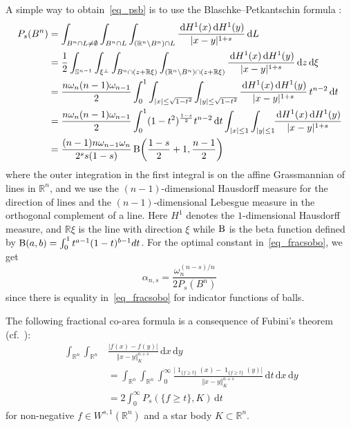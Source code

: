 \documentclass{amsart}
\newcommand{\Bvtex}{{B^n}}
\newcommand{\snvtex}{{\mathbb S}^{n-1}}
\newcommand{\dvtex}{\,\mathrm{d}}
\renewcommand{\chi}{\operatorname{1}}
\begin{document}
A simple way to obtain~\eqref{eq_psb} is to use the Blaschke--Petkantschin
formula \cite[Theorem 7.2.7]{SchneiderWeil}:
%
\begin{align*}
%
P_{s}(\Bvtex )
&= \int _{\Bvtex \cap L\ne \emptyset} \int _{\Bvtex \cap L} \int _{(\mathbb R^{n}
\backslash \Bvtex )\cap L}
\frac{\dvtex H^{1}(x)\dvtex H^{1}(y)}{\vert x-y\vert ^{1+s}} \dvtex L
\\
&=\frac{1}{2}\int _{\snvtex} \int _{\xi ^{\perp}} \int _{\Bvtex \cap (z+
\mathbb R\xi )}\int _{(\mathbb R^{n}\backslash \Bvtex )\cap (z+\mathbb R
\xi )} \frac{\dvtex H^{1}(x)\dvtex H^{1}(y) }{\vert x-y\vert ^{1+s}}\dvtex z \dvtex
\xi
\\
&=\frac{n\omega _{n} (n-1)\omega _{n-1}}{2} \int _{0}^{1} \int _{
\vert x\vert \le \sqrt{1-t^{2}}}\int _{\vert y\vert \le \sqrt{1-t^{2}}}
\frac{\dvtex H^{1}(x)\dvtex H^{1}(y)}{\vert x-y\vert ^{1+s}}\, t^{n-2}\dvtex t
\\
&=\frac{n\omega _{n} (n-1)\omega _{n-1}}{2} \int _{0}^{1}(1-t^{2})^{
\frac{1-s}{2}} t^{n-2}\dvtex t \int _{\vert x\vert \le 1}\int _{\vert y
\vert \le 1} \!\!\frac{\dvtex H^{1}(x)\dvtex H^{1}(y)}{\vert x-y\vert ^{1+s}}
\\
&=\frac{(n-1)n \omega _{n-1}\omega _{n}}{2^{s}s(1-s)}\, {\rm B}\biggl(\frac{1-s}{2}+1,\frac{n-1}{2}\biggr)
%
\end{align*}
%
where the outer integration in the first integral is on the affine Grassmannian
of lines in $\mathbb R^{n}$, and we use the $(n-1)$-dimensional Hausdorff
measure for the direction of lines and the $(n-1)$-dimensional Lebesgue
measure in the orthogonal complement of a line. Here $H^{1}$ denotes the
$1$-dimensional Hausdorff measure, and $\mathbb R\xi $ is the line with
direction $\xi $ while $\rm B$ is the beta function defined by
${\rm B}(a,b) = \int _{0}^{1} t^{a-1}(1-t)^{b-1} dt$. For the optimal constant
in~\eqref{eq_fracsobo}, we get
%
\begin{equation}
\label{eq_alpha}
\alpha _{n,s}= \frac{\omega _{n}^{(n-s)/n}}{2 P_{s}(\Bvtex )}
\end{equation}
%
since there is equality in~\eqref{eq_fracsobo} for indicator functions
of balls.

The following fractional co-area formula is a consequence of Fubini's theorem
(cf.\ \cite[Example~(2.9)]{Visintin90}):
%
\begin{align}
\,\,\int _{\mathbb R^{n}}\int _{\mathbb R^{n}} &
\frac{\vert f(x)-f(y)\vert}{\Vert x-y\Vert _{K}^{n+s}} \dvtex x\dvtex y
\nonumber \\
&=\int _{\mathbb R^{n}}\int _{\mathbb R^{n}} \int _{0}^{\infty }
\frac{\vert \chi _{\{f\ge t\}}(x)-\chi _{\{f\ge t\}}(y)\vert}{\Vert x-y\Vert _{K}^{n+s}}
\dvtex t \dvtex x\dvtex y
\label{eq_coarea}
\\
&= 2 \int _{0}^{\infty }P_{s}(\{ f\ge t\},K)\dvtex t
\nonumber \end{align}
%
for non-negative $f\in W^{s,1}(\mathbb R^{n})$ and a star body
$K\subset \mathbb R^{n}$.
\end{document}
